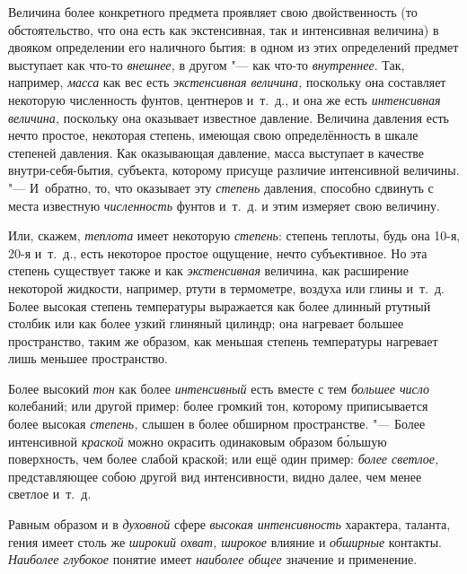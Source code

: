 Величина более конкретного предмета проявляет свою двойственность (то
обстоятельство, что она есть как экстенсивная, так и интенсивная величина)
в двояком определении его наличного бытия: в одном из этих определений
предмет выступает как что-то {\em внешнее,} в другом "--- как что-то
{\em внутреннее}. Так, например, {\em масса} как вес есть {\em экстенсивная
величина,} поскольку она составляет некоторую численность фунтов, центнеров
и~т.~д., и она же есть {\em интенсивная величина,} поскольку она оказывает
известное давление. Величина давления есть нечто простое, некоторая степень,
имеющая свою определённость в шкале степеней давления. Как оказывающая
давление, масса выступает в качестве внутри-себя-бытия, субъекта, которому
присуще различие интенсивной величины. "--- И~обратно, то, что оказывает эту
{\em степень} давления, способно сдвинуть с места известную {\em численность}
фунтов и~т.~д. и этим измеряет свою величину.

Или, скажем, {\em теплота} имеет некоторую {\em степень}: степень теплоты, будь
она 10-я, 20-я и~т.~д., есть некоторое простое ощущение, нечто субъективное. Но
эта степень существует также и как {\em экстенсивная} величина, как расширение
некоторой жидкости, например, ртути в термометре, воздуха или глины и~т.~д.
Более высокая степень температуры выражается как более длинный ртутный столбик
или как более узкий глиняный цилиндр; она нагревает большее пространство,
таким же образом, как меньшая степень температуры нагревает лишь меньшее
пространство.

Более высокий {\em тон} как более {\em интенсивный} есть вместе с тем
{\em большее число} колебаний; или другой пример: более громкий тон,
которому приписывается более высокая {\em степень,} слышен в более обширном
пространстве. "--- Более интенсивной {\em краской} можно окрасить одинаковым
образом б\'{о}льшую поверхность, чем более слабой краской; или ещё один пример:
{\em более светлое,} представляющее собою другой вид интенсивности, видно
далее, чем менее светлое и~т.~д.

Равным образом и в {\em духовной} сфере {\em высокая интенсивность} характера,
таланта, гения имеет столь же {\em широкий охват, широкое}
влияние и {\em обширные} контакты.
{\em Наиболее глубокое} понятие имеет {\em наиболее общее}
значение и применение.


